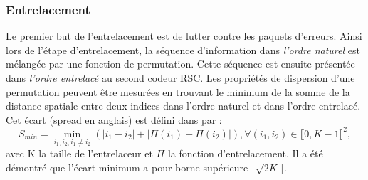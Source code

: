 \subsubsection{Entrelacement}\label{sec:entrelacement}
Le premier but de l'entrelacement est de lutter contre les paquets d'erreurs. Ainsi lors de l'étape d'entrelacement, la 
séquence d'information dans \emph{l'ordre naturel} est mélangée par une fonction de permutation. Cette séquence est ensuite 
présentée dans \emph{l'ordre entrelacé} au second codeur RSC. Les propriétés de dispersion d'une permutation peuvent être 
mesurées en trouvant le minimum de la somme de la distance spatiale entre deux indices dans l'ordre naturel et dans l'ordre 
entrelacé. Cet écart (spread en anglais) est défini dans \cite{crozier2000new} par : 
\[S_{min} = \min\limits_{i_1, i_2, i_1 \ne i_2} \left( |i_1 - i_2| + |\Pi(i_1) - \Pi(i_2)| \right), \forall (i_1, i_2) \in \llbracket 0, K-1 \rrbracket ^2, \]
avec K la taille de l'entrelaceur et $\Pi$ la fonction d'entrelacement. 
Il a été démontré \cite{crozier2000new} que l'écart minimum a pour borne supérieure $\lfloor{\sqrt{2K}}\rfloor $.

